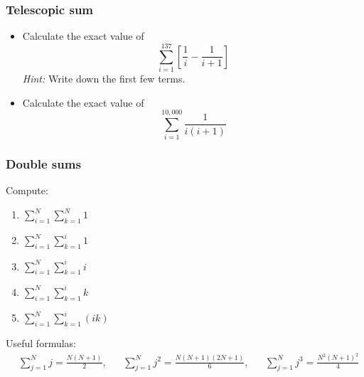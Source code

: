 \begin{frame}[t]
	\frametitle{Telescopic sum}

	\begin{itemize}
		\item Calculate the exact value of
			\[
				\sum_{i=1}^{137}\left[ \frac{1}{i}- \frac{1}{i+1}\right]
			\]
			\emph{Hint:} Write down the first few terms.


		\item Calculate the exact value of
			\[
				\sum_{i=1}^{10,000}\frac{1}{i(i+1)}
			\]
	\end{itemize}
\end{frame}

\begin{frame}[t]
	\frametitle{Double sums}

	Compute:
	\begin{multicols}{3}
		\begin{enumerate}
			\item $\displaystyle \sum_{i=1}^{N}\sum_{k=1}^{N}1$

			\item $\displaystyle \sum_{i=1}^{N}\sum_{k=1}^{i}1$

			\item $\displaystyle \sum_{i=1}^{N}\sum_{k=1}^{i}i$

			\item $\displaystyle \sum_{i=1}^{N}\sum_{k=1}^{i}k$

			\item $\displaystyle \sum_{i=1}^{N}\sum_{k=1}^{i}(ik)$
		\end{enumerate}
	\end{multicols}

	\vfill

	{\fontsize{10}{10}\selectfont Useful formulas: \begin{align*}&\sum_{j=1}^{N}j = \frac{N(N+1)}{2},&&\sum_{j=1}^{N}j^{2}= \frac{N(N+1)(2N+1)}{6},&&\sum_{j=1}^{N}j^{3}= \frac{N^{2}(N+1)^{2}}{4}\end{align*} }
\end{frame}


